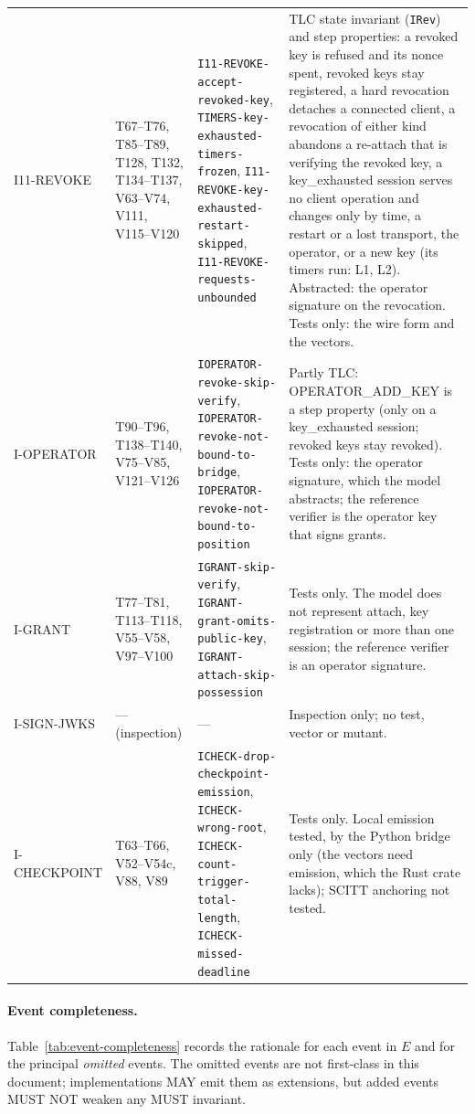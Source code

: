 \begin{table}[htbp]
\begin{tabularx}{\columnwidth}{l l X X}
I11-REVOKE & T67--T76, T85--T89, T128, T132, T134--T137, V63--V74, V111, V115--V120 & \texttt{I11-REVOKE-accept-revoked-key}, \texttt{TIMERS-key-exhausted-timers-frozen}, \texttt{I11-REVOKE-key-exhausted-restart-skipped}, \texttt{I11-REVOKE-requests-unbounded} & TLC state invariant (\texttt{IRev}) and step properties: a revoked key is refused and its nonce spent, revoked keys stay registered, a hard revocation detaches a connected client, a revocation of either kind abandons a re-attach that is verifying the revoked key, a key\_exhausted session serves no client operation and changes only by time, a restart or a lost transport, the operator, or a new key (its timers run: L1, L2). Abstracted: the operator signature on the revocation. Tests only: the wire form and the vectors. \\
I-OPERATOR & T90--T96, T138--T140, V75--V85, V121--V126 & \texttt{IOPERATOR-revoke-skip-verify}, \texttt{IOPERATOR-revoke-not-bound-to-bridge}, \texttt{IOPERATOR-revoke-not-bound-to-position} & Partly TLC: OPERATOR\_ADD\_KEY is a step property (only on a key\_exhausted session; revoked keys stay revoked). Tests only: the operator signature, which the model abstracts; the reference verifier is the operator key that signs grants. \\
I-GRANT & T77--T81, T113--T118, V55--V58, V97--V100 & \texttt{IGRANT-skip-verify}, \texttt{IGRANT-grant-omits-public-key}, \texttt{IGRANT-attach-skip-possession} & Tests only. The model does not represent attach, key registration or more than one session; the reference verifier is an operator signature. \\
I-SIGN-JWKS & --- (inspection) & --- & Inspection only; no test, vector or mutant. \\
I-CHECKPOINT & T63--T66, V52--V54c, V88, V89 & \texttt{ICHECK-drop-checkpoint-emission}, \texttt{ICHECK-wrong-root}, \texttt{ICHECK-count-trigger-total-length}, \texttt{ICHECK-missed-deadline} & Tests only. Local emission tested, by the Python bridge only (the vectors need emission, which the Rust crate lacks); SCITT anchoring not tested. \\
\bottomrule
\end{tabularx}
\end{table}

\paragraph{Event completeness.}
Table~\ref{tab:event-completeness} records the rationale for each
event in $E$ and for the principal \emph{omitted} events. The omitted
events are not first-class in this document; implementations MAY emit
them as extensions, but added events MUST NOT weaken any MUST invariant.

